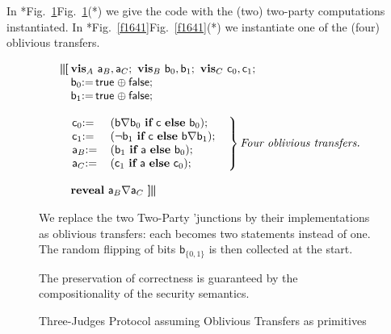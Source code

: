 \documentclass[runningheads]{llncs}
\newcommand\Va {\mathsf{a}}
\newcommand\Vb {\mathsf{b}}
\newcommand\Vc {\mathsf{c}}
\newcommand\Gets {{:}{=}\,}
\newcommand\If {\textbf{if}}
\newcommand\Else {\textbf{else}}
\newcommand\Reveal {\textbf{reveal}}
\newcommand\PC[1] {\mathbin{_{#1}\oplus}} \newcommand\UC[1] {\mathbin{_{#1}\uplus}} \newcommand{\ITE}[3]{#1\,\IF\,#2\,\ELSE\,#3}
\newcommand\True {\textsf{true}}
\newcommand\False {\textsf{false}}
\newcommand\Xor {\mathbin{\nabla}}
\newcommand\Vis {\textbf{vis}}
\newcommand{\Begin}{\mbox{\boldmath\textbf{$\parallel\kern-.365em[$}}}
\newcommand{\End}{\mbox{\boldmath\textbf{$]\kern-.365em\parallel$}}}
\newcommand\InQuadL[1] {\makebox[0pt][l]{$#1$}\quad}
\newcommand\IF {\textbf{if}}
\newcommand\ELSE {\textbf{else}}
\newenvironment{Figure}[2][t]{\begin{figure}[#1]\def\Label{#2}\small}{\label{\Label}\end{figure}}
\newcommand\Fig[2][*] {{\def\z{#1}\if*\z Fig.~\ref{#2}\else Fig.~\ref{#2}(#1)\fi}}
\begin{document}
In \Fig{f1640} we give the code with the (two) two-party computations instantiated. In \Fig{f1641} we instantiate one of the (four) oblivious transfers.
\begin{Figure}{f1640}
\[
 \begin{array}{l}
  \InQuadL{\Begin} \Vis_{A}~\Va_{B}, \Va_{C};~ \Vis_{B}~\Vb_{0},\Vb_{1};~ \Vis_{C}~\Vc_{0}, \Vc_{1}; \\
  \quad \Vb_0\Gets\True\PC{}\False; \\
  \quad \Vb_1\Gets\True\PC{}\False; \\\\
  \quad\left.\begin{array}{@{}ll}
             \Vc_0\Gets& (\Vb{\Xor}\Vb_0~\If~\Vc~\Else~\Vb_0); \\
             \Vc_1\Gets& (\neg \Vb_1~\If~\Vc~\Else~\Vb{\Xor}\Vb_1); \\
             \Va_B\Gets& (\Vb_1~\If~\Va~\Else~\Vb_0); \\
             \Va_C\Gets& (\Vc_1~\If~\Va~\Else~\Vc_0);
            \end{array}
            ~~\right\}\textit{Four oblivious transfers.}
            \\\\
  \quad \Reveal~\Va_{B}{\Xor}\Va_{C}~\End
 \end{array}
\]

We replace the two Two-Party 'junctions by their implementations as oblivious transfers: each becomes two statements instead of one. The random flipping of bits $\Vb_{\{0,1\}}$ is then collected at the start.

\medskip
The preservation of correctness is guaranteed by the compositionality of the security semantics.
\caption{Three-Judges Protocol assuming Oblivious Transfers as primitives}
\end{Figure}
\end{document}
